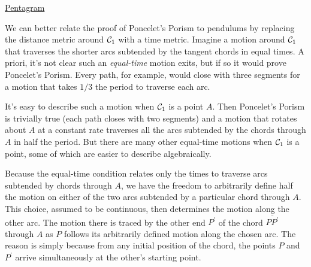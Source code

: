 \documentclass{ximera}
\begin{document}
\begin{exploration}
\begin{onlineOnly}
    \begin{center}
\end{center}
\end{onlineOnly}

\href{https://www.desmos.com/calculator/qco4rghhfi}{Pentagram}

\end{exploration}

We can better relate the proof of Poncelet's Porism to pendulums by replacing the distance metric around ${\cal C}_1$ with a time metric. Imagine a motion around ${\cal C}_1$ that traverses the shorter arcs subtended by the tangent chords in equal times. A priori, it's not clear such an \emph{equal-time} motion exits, but if so it would prove Poncelet's Porism. Every path, for example, would close with three segments for a motion that takes $1/3$ the period to traverse each arc. %

It's easy to describe such a motion when ${\cal C}_1$ is a point $A$. Then Poncelet's Porism is trivially true (each path closes with two segments) and a motion that rotates about $A$ at a constant rate traverses all the arcs subtended by the chords through $A$ in half the period. But there are many other equal-time motions when ${\cal C}_1$ is a point, some of which are easier to describe algebraically. 

Because the equal-time condition relates only the times to traverse arcs subtended by chords through $A$, we have the freedom to arbitrarily define half the motion on either of the two arcs subtended by a particular chord through $A$. This choice, assumed to be continuous, then determines the motion along the other arc. The motion there is traced by the other end $P^\prime$ of the chord $\overline{PP^\prime}$ through $A$ as $P$ follows its arbitrarily defined motion along the chosen arc. The reason is simply because from any initial position of the chord, the points $P$ and $P^\prime$ arrive simultaneously at the other's starting point.



\end{document}
